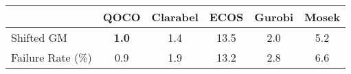 \begin{tabular}{lccccc}
  \hline
   & \textbf{QOCO} & \textbf{Clarabel} & \textbf{ECOS} & \textbf{Gurobi} & \textbf{Mosek} \\ \hline
  Shifted GM & \textbf{1.0} & 1.4 & 13.5 & 2.0 & 5.2 \\ 
  Failure Rate (\%) & 0.9 & 1.9 & 13.2 & 2.8 & 6.6 \\ \hline 
\end{tabular}
